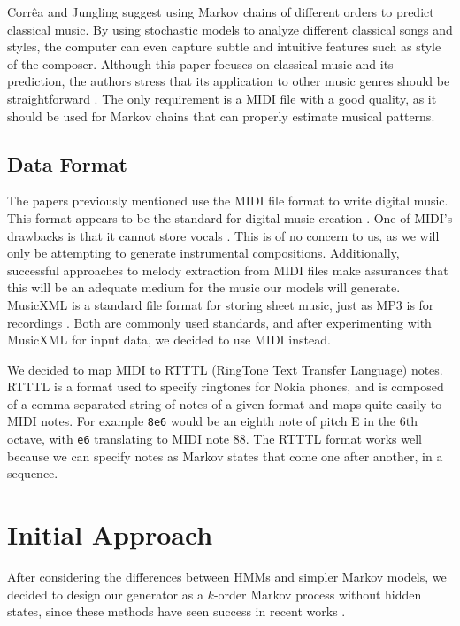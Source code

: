 \documentclass{article}
\begin{document}
Corrêa and Jungling suggest using Markov chains of different orders to predict classical music. By using stochastic models to analyze different classical songs and styles,
the computer can even capture subtle and intuitive features such as style of the composer. Although this paper focuses on classical music and its prediction, the authors 
stress that its application to other music genres should be straightforward \cite{correa_jungling_small_2020}. 
The only requirement is a MIDI file with a good quality, as it should be used for Markov chains that can properly estimate musical patterns.

\subsection{Data Format}
The papers previously mentioned use the MIDI file format to write digital music. This format appears to be the standard for digital music creation \cite{midi_format}. 
One of MIDI's drawbacks is that it cannot store vocals \cite{cataltepe_2007}. This is of no concern to us, as we will only be attempting to generate instrumental 
compositions. Additionally, successful approaches to melody extraction from MIDI files \cite{ozcan_2005} make assurances that this will be an adequate medium for the 
music our models will generate. MusicXML is a standard file format for storing sheet music, just as MP3 is for recordings \cite{musicxml_2022}. Both are commonly used 
standards, and after experimenting with MusicXML for input data, we decided to use MIDI instead.

We decided to map MIDI to RTTTL (RingTone Text Transfer Language) notes. RTTTL is a format used to specify ringtones for Nokia phones, and is composed of a comma-separated 
string of notes of a given format \cite{rtttl_spec} and maps quite easily to MIDI notes. For example \texttt{8e6} would be an eighth note of pitch E in the 6th octave, 
with \texttt{e6} translating to MIDI note 88. The RTTTL format works well because we can specify notes as Markov states that come one after another, in a sequence.

\section{Initial Approach}
After considering the differences between HMMs and simpler Markov models, we decided to design our generator as a $k$-order Markov process without hidden states, 
since these methods have seen success in recent works \cite{shapiro_huber_2021,correa_jungling_small_2020}. 
\end{document}

